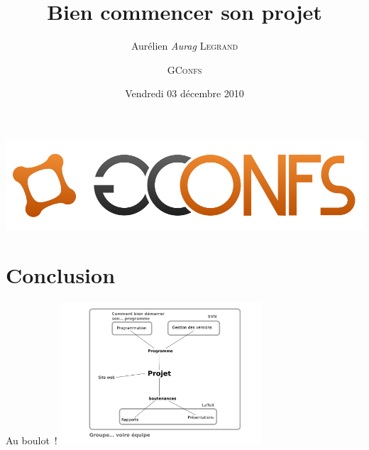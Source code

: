 \documentclass{beamer}
\begin{document}
\title{Bien commencer son projet}
\author{Aurélien \textit{Aurag} \textsc{Legrand} \and \textsc{GConfs}}
\date{Vendredi 03 décembre 2010}

\begin{frame}
  \begin{center}
    \includegraphics[scale=0.35]{images/logo}
  \end{center}

  \maketitle
\end{frame}

\begin{frame}
  \tableofcontents
\end{frame}










%

\section{Conclusion}
\begin{frame}{Au boulot~!}
  \includegraphics[height=200px]{brainstorming-9.pdf}
\end{frame}
\end{document}
